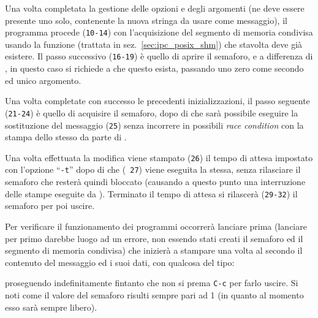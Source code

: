 Una volta completata la gestione delle opzioni e degli argomenti (ne deve
essere presente uno solo, contenente la nuova stringa da usare come
messaggio), il programma procede (\texttt{\small 10-14}) con l'acquisizione
del segmento di memoria condivisa usando la funzione  (trattata
in sez.~\ref{sec:ipc_posix_shm}) che stavolta deve già esistere.  Il passo
successivo (\texttt{\small 16-19}) è quello di aprire il semaforo, e a
differenza di , in questo caso si richiede a
 che questo esista, passando uno zero come secondo ed unico
argomento.

Una volta completate con successo le precedenti inizializzazioni, il passo
seguente (\texttt{\small 21-24}) è quello di acquisire il semaforo, dopo di
che sarà possibile eseguire la sostituzione del messaggio (\texttt{\small 25})
senza incorrere in possibili \textit{race condition} con la stampa dello
stesso da parte di .

Una volta effettuata la modifica viene stampato (\texttt{\small 26}) il tempo
di attesa impostato con l'opzione ``\texttt{-t}'' dopo di che (\texttt{\small
  27}) viene eseguita la stessa, senza rilasciare il semaforo che resterà
quindi bloccato (causando a questo punto una interruzione delle stampe
eseguite da ). Terminato il tempo di attesa si rilascerà
(\texttt{\small 29-32}) il semaforo per poi uscire.

Per verificare il funzionamento dei programmi occorrerà lanciare prima
 (lanciare per primo  darebbe
luogo ad un errore, non essendo stati creati il semaforo ed il segmento di
memoria condivisa) che inizierà a stampare una volta al secondo il contenuto
del messaggio ed i suoi dati, con qualcosa del tipo:
proseguendo indefinitamente fintanto che non si prema \texttt{C-c} per farlo
uscire. Si noti come il valore del semaforo risulti sempre pari ad 1 (in
quanto al momento esso sarà sempre libero). 

